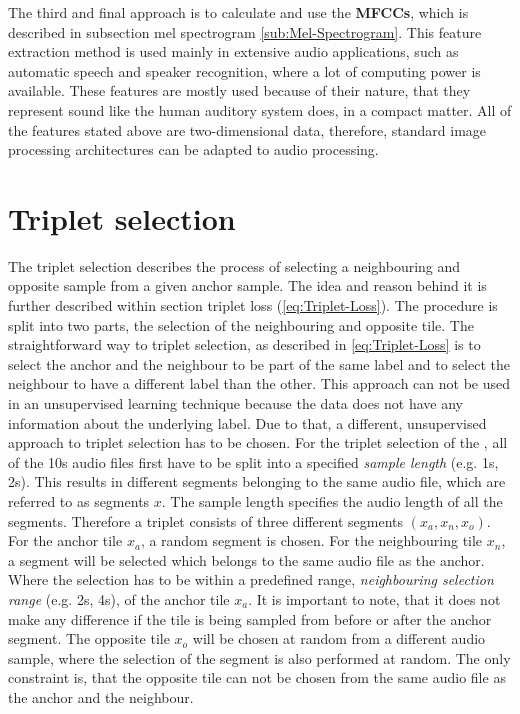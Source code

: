 \newline
\newline
The third and final approach is to calculate and use the \textbf{\glspl{MFCC}}, which is described in subsection mel spectrogram \ref{sub:Mel-Spectrogram}. This feature extraction method is used mainly in extensive audio applications, such as automatic speech and speaker recognition, where a lot of computing power is available. These features are mostly used because of their nature, that they represent sound like the human auditory system does, in a compact matter.
\newline
\newline
All of the features stated above are two-dimensional data, therefore, standard image processing architectures can be adapted to audio processing.

\section{Triplet selection}
\label{sec:Triplet-Selection}
The triplet selection describes the process of selecting a neighbouring and opposite sample from a given anchor sample. The idea and reason behind it is further described within section triplet loss (\ref{eq:Triplet-Loss}). The procedure is split into two parts, the selection of the neighbouring and opposite tile.
\newline
\newline
The straightforward way to triplet selection, as described in \ref{eq:Triplet-Loss} is to select the anchor and the neighbour to be part of the same label and to select the neighbour to have a different label than the other. This approach can not be used in an unsupervised learning technique because the data does not have any information about the underlying label. Due to that, a different, unsupervised approach to triplet selection has to be chosen.
\newline
\newline
For the triplet selection of the , all of the 10s audio files first have to be split into a specified \textit{sample length} (e.g. 1s, 2s). This results in different segments belonging to the same audio file, which are referred to as segments $x$. The sample length specifies the audio length of all the segments. Therefore a triplet consists of three different segments $(x_a, x_n, x_o)$.
\newline
For the anchor tile $x_a$, a random segment is chosen. For the neighbouring tile $x_n$, a segment will be selected which belongs to the same audio file as the anchor. Where the selection has to be within a predefined range, \textit{neighbouring selection range} (e.g. 2s, 4s), of the anchor tile $x_a$. It is important to note, that it does not make any difference if the tile is being sampled from before or after the anchor segment. The opposite tile $x_o$ will be chosen at random from a different audio sample, where the selection of the segment is also performed at random. The only constraint is, that the opposite tile can not be chosen from the same audio file as the anchor and the neighbour.
